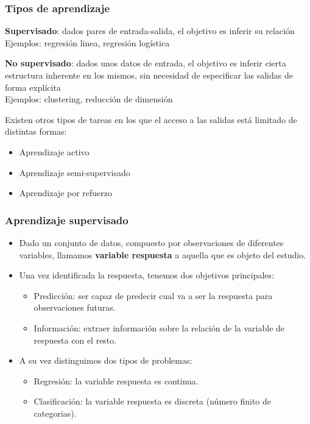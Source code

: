 \documentclass{beamer}
\newenvironment{wideitemize}{\itemize\addtolength{\itemsep}{12pt}}{\enditemize}
\begin{document}
\begin{frame}
\frametitle{Tipos de aprendizaje}

\begin{wideitemize}
\item \textbf{Supervisado}: dados pares de entrada-salida, el objetivo es inferir su relación \\
Ejemplos: regresión linea, regresión logística 

\item \textbf{No supervisado}: dados unos datos de entrada, el objetivo es inferir cierta estructura inherente en los mismos, sin necesidad de especificar las salidas de forma explícita\\
Ejemplos: clustering, reducción de dimensión

\item Existen otros tipos de tareas en los que el acceso a las salidas está limitado de distintas formas:
\begin{itemize}
\item Aprendizaje activo
\item Aprendizaje semi-supervisado
\item Aprendizaje por refuerzo
\end{itemize}
\end{wideitemize}
\end{frame}


\begin{frame}
\frametitle{Aprendizaje supervisado}

\begin{itemize}
\item Dado un conjunto de datos, compuesto por observaciones de diferentes variables, llamamos \textbf{variable respuesta} a aquella que es objeto del estudio.

\item Una vez identificada la respuesta, tenemos dos objetivos principales:

\begin{itemize}
\item Predicción: ser capaz de predecir cual va a ser la respuesta para observaciones futuras.
\item Información: extraer información sobre la relación de la variable de respuesta con el resto.
\end{itemize}

\item A su vez distinguimos dos tipos de problemas:

\begin{itemize}
\item Regresión: la variable respuesta es continua.
\item Clasificación: la variable respuesta es discreta (número finito de categorias).
\end{itemize}
\end{itemize}
\end{frame}
\end{document}
